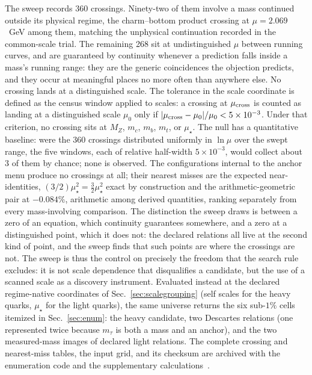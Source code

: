 \documentclass[aps,twocolumn,superscriptaddress,nofootinbib,floatfix]{revtex4-2}
\newcommand{\mstar}{\mu_\star}
\begin{document}
The sweep records 360 crossings. Ninety-two of them involve a mass continued outside its physical regime, the charm--bottom product crossing at $\mu=2.069$~GeV among them, matching the unphysical continuation recorded in the common-scale trial. The remaining 268 sit at undistinguished $\mu$ between running curves, and are guaranteed by continuity whenever a prediction falls inside a mass's running range: they are the generic coincidences the objection predicts, and they occur at meaningful places no more often than anywhere else. No crossing lands at a distinguished scale. The tolerance in the scale coordinate is defined as the census window applied to scales: a crossing at $\mu_{\rm cross}$ is counted as landing at a distinguished scale $\mu_0$ only if $|\mu_{\rm cross}-\mu_0|/\mu_0<5\times10^{-3}$. Under that criterion, no crossing sits at $M_Z$, $m_c$, $m_b$, $m_t$, or $\mstar$. The null has a quantitative baseline: were the $360$ crossings distributed uniformly in $\ln\mu$ over the swept range, the five windows, each of relative half-width $5\times10^{-3}$, would collect about $3$ of them by chance; none is observed. The configurations internal to the anchor menu produce no crossings at all; their nearest misses are the expected near-identities, $(3/2)\mstar^2=\frac32\mstar^2$ exact by construction and the arithmetic-geometric pair at $-0.084\%$, arithmetic among derived quantities, ranking separately from every mass-involving comparison. The distinction the sweep draws is between a zero of an equation, which continuity guarantees somewhere, and a zero at a distinguished point, which it does not: the declared relations all live at the second kind of point, and the sweep finds that such points are where the crossings are not. The sweep is thus the control on precisely the freedom that the search rule excludes: it is not scale dependence that disqualifies a candidate, but the use of a scanned scale as a discovery instrument. Evaluated instead at the declared regime-native coordinates of Sec.~\ref{sec:scalegrouping} (self scales for the heavy quarks, $\mstar$ for the light quarks), the same universe returns the six sub-$1\%$ cells itemized in Sec.~\ref{sec:enum}: the heavy candidate, two Descartes relations (one represented twice because $m_\tau$ is both a mass and an anchor), and the two measured-mass images of declared light relations. The complete crossing and nearest-miss tables, the input grid, and its checksum are archived with the enumeration code and the supplementary calculations~\cite{BrilliantGitHubEnum,BrilliantZenodoSupp}.
\end{document}
